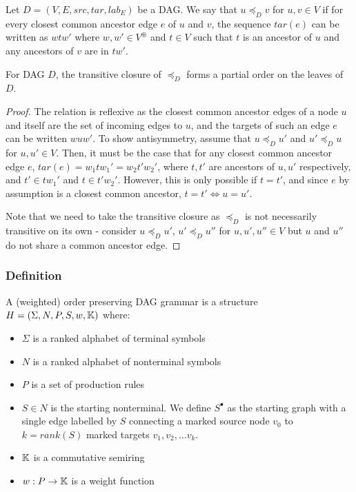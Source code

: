 \documentclass[11pt]{article}
\begin{document}
\begin{definition}
    Let $D = (V,E,src,tar,lab_E)$ be a DAG. We say that $u \preceq_D v$ for $u,v
    \in V$ if for every closest common ancestor edge $e$ of $u$ and $v$, the
    sequence $tar(e)$ can be written as $wtw'$ where $w,w' \in V^\circledast$
    and $t\in V$ such that $t$ is an ancestor of $u$ and any ancestors of $v$
    are in $tw'$. 
\end{definition}
\begin{claim}
For DAG $D$, the transitive closure of $\preceq_D$ forms a partial order on the
leaves of $D$.
\end{claim}
\begin{proof} The relation is reflexive as the closest common ancestor edges of
a node $u$ and itself are the set of incoming edges to $u$, and the targets of
such an edge $e$ can be written $wuw'$. To show antisymmetry, assume that $u
\preceq_D u'$ and $u' \preceq_D u$ for $u,u' \in V$. Then, it must be the case
that for any closest common ancestor edge $e$, $tar(e) = w_1tw_1' = w_2t'w_2'$,
where $t,t'$ are ancestors of $u,u'$ respectively, and $t' \in tw_1'$ and $t \in
t'w_2'$. However, this is only possible if $t = t'$, and since $e$ by assumption
is a closest common ancestor, $t = t' \Longleftrightarrow u = u'$. 

Note that we need to take the transitive closure as $\preceq_D$ is not
necessarily transitive on its own - consider $u \preceq_D u'$, $u' \preceq_D
u''$ for $u,u',u'' \in V$ but $u$ and $u''$ do not share a common ancestor edge. 
\end{proof}

\subsubsection{Definition}
A (weighted) order preserving DAG grammar is a structure $H = (\Sigma, N, P, S,
w, \mathbb{K})$ where:
\begin{itemize}
    \item $\Sigma$ is a ranked alphabet of terminal symbols
    \item $N$ is a ranked alphabet of nonterminal symbols
    \item $P$ is a set of production rules
    \item $S \in N$ is the starting nonterminal. We define $S^\bullet$ as the
    starting graph with a single edge labelled by $S$ connecting a marked source
    node $v_0$ to $k=rank(S)$ marked targets $v_1,v_2,\ldots v_k$. 
    \item $\mathbb{K}$ is a commutative semiring
    \item $w: P \rightarrow \mathbb{K}$ is a weight function
\end{itemize}
\end{document}
